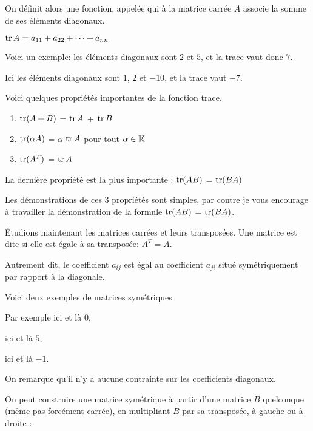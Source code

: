 \change
On définit alors une fonction, appelée  qui à la matrice carrée $A$ 
associe la somme de ses éléments diagonaux.

$\mathop{\text{tr}}\nolimits A = a_{11} + a_{22} + \cdots +a_{nn}$

\change
Voici un exemple: les éléments diagonaux sont $2$ et $5$, et la trace vaut donc $7$.

\change
Ici les éléments diagonaux sont $1$, $2$ et $-10$, et la trace vaut $-7$.

\diapo

Voici quelques propriétés importantes de la fonction trace.
\begin{enumerate}
\item $\mathop{\text{tr}}\nolimits(A + B)$ = $\mathop{\text{tr}}\nolimits A$ + $\mathop{\text{tr}}\nolimits B$
\item $\mathop{\text{tr}}\nolimits(\alpha A)$ = $\alpha$ $\mathop{\text{tr}}\nolimits A$ pour tout $\alpha \in \mathbb{K}$
\item $\mathop{\text{tr}}\nolimits(A^T)$ = $\mathop{\text{tr}}\nolimits A $
\end{enumerate}

La dernière propriété est la plus importante :
$\mathop{\text{tr}}\nolimits(AB)$ = $\mathop{\text{tr}}\nolimits(BA)$

Les démonstrations de ces 3 propriétés sont simples,
par contre je vous encourage à travailler la démonstration
de la formule $\mathop{\text{tr}}\nolimits(AB)$ = $\mathop{\text{tr}}\nolimits(BA)$.



\diapo

Étudions maintenant les matrices carrées et leurs transposées.
Une matrice est dite  si elle est égale à sa transposée:
$A^T = A$.

\change
Autrement dit, le coefficient $a_{ij}$ est égal au coefficient $a_{ji}$
situé symétriquement par rapport à la diagonale.

\change
Voici deux exemples de matrices symétriques. 

Par exemple ici et là $0$,

ici et là $5$,

ici et là $-1$.

On remarque qu'il n'y a aucune contrainte sur les coefficients diagonaux.



\diapo

On peut construire une matrice symétrique à partir d'une matrice $B$ quelconque
(même pas forcément carrée), en multipliant $B$ par sa transposée, à gauche ou à droite :

